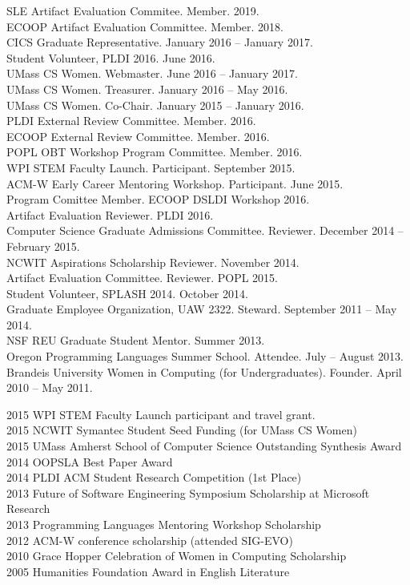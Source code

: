 \documentclass[10pt]{article}
\newcommand{\cvsec}[2]{
    \begin{tcolorbox}[width=\textwidth, breakable, title={#1}]
        #2
    \end{tcolorbox}
    \vspace{10pt}
}
\begin{document}
\cvsec{Professional Activities and Service}{
  SLE Artifact Evaluation Commitee. Member. 2019.\\
  ECOOP Artifact Evaluation Committee. Member. 2018.\\
  CICS Graduate Representative. January 2016 -- January 2017.\\
  Student Volunteer, PLDI 2016. June 2016. \\
  UMass CS Women. Webmaster. June 2016 -- January 2017.\\
  UMass CS Women. Treasurer. January 2016 -- May 2016.\\
  UMass CS Women. Co-Chair. January 2015 -- January 2016.\\
  PLDI External Review Committee.  Member.  2016.\\
  ECOOP External Review Committee.  Member.  2016.\\
  POPL OBT Workshop Program Committee.  Member.  2016.\\
  WPI STEM Faculty Launch.  Participant.  September 2015.\\
  ACM-W Early Career Mentoring Workshop.  Participant.  June 2015.\\
  Program Comittee Member. ECOOP DSLDI Workshop 2016. \\
  Artifact Evaluation Reviewer. PLDI 2016. \\
  Computer Science Graduate Admissions Committee. Reviewer. December 2014 -- February 2015.\\
  NCWIT Aspirations Scholarship Reviewer. November 2014. \\
  Artifact Evaluation Committee. Reviewer. POPL 2015.\\
  Student Volunteer, SPLASH 2014. October 2014.\\
  Graduate Employee Organization, UAW 2322. Steward. September 2011 -- May 2014.\\
  NSF REU Graduate Student Mentor. Summer 2013.\\
  Oregon Programming Languages Summer School. Attendee. July -- August 2013.	\\
  Brandeis University Women in Computing (for Undergraduates). Founder. April 2010 -- May 2011.
}


\cvsec{Honors, Scholarships, and Awards}{
  2015 WPI STEM Faculty Launch participant and travel grant.\\
  2015 NCWIT Symantec Student Seed Funding (for UMass CS Women)\\
  2015 UMass Amherst School of Computer Science Outstanding Synthesis Award\\
  2014 OOPSLA Best Paper Award\\
  2014 PLDI ACM Student Research Competition (1st Place)\\
  2013 Future of Software Engineering Symposium Scholarship at Microsoft Research\\
  2013 Programming Languages Mentoring Workshop Scholarship\\
  2012 ACM-W conference scholarship (attended SIG-EVO)\\
  2010 Grace Hopper Celebration of Women in Computing Scholarship\\
  2005 Humanities Foundation Award in English Literature\\
}
\end{document}
